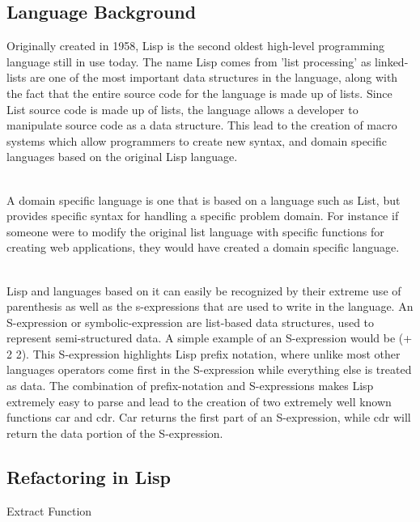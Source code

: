 \documentclass{article}
\begin{document}

\subsection*{Language Background}

Originally created in 1958, Lisp is the second oldest high-level programming language still in use today. The name Lisp comes from 'list processing' as linked-lists are one of the most important data structures in the language, along with the fact that the entire source code for the language is made up of lists. Since List source code is made up of lists, the language allows a developer to manipulate source code as a data structure. This lead to the creation of macro systems which allow programmers to create new syntax, and domain specific languages based on the original Lisp language.

\\A domain specific language is one that is based on a language such as List, but provides specific syntax for handling a specific problem domain. For instance if someone were to modify the original list language with specific functions for creating web applications, they would have created a domain specific language.

\\Lisp and languages based on it can easily be recognized by their extreme use of parenthesis as well as the s-expressions that are used to write in the language. An S-expression or symbolic-expression are list-based data structures, used to represent semi-structured data. A simple example of an S-expression would be (+ 2 2). This S-expression highlights Lisp prefix notation, where unlike most other languages operators come first in the S-expression while everything else is treated as data. The combination of prefix-notation and S-expressions makes Lisp extremely easy to parse and lead to the creation of two extremely well known functions car and cdr. Car returns the first part of an S-expression, while cdr will return the data portion of the S-expression.


\subsection*{Refactoring in Lisp}

Extract Function
\end{document}
